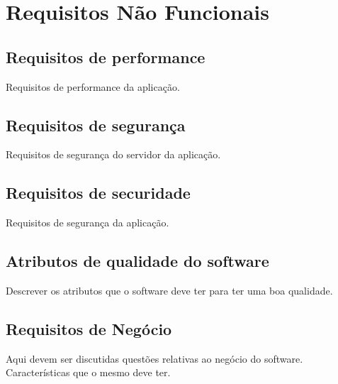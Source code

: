 \chapter{Requisitos Não Funcionais}

\section{Requisitos de performance}

Requisitos de performance da aplicação.

\section{Requisitos de segurança}

Requisitos de segurança do servidor da aplicação.

\section{Requisitos de securidade}

Requisitos de segurança da aplicação.

\section{Atributos de qualidade do software}

Descrever os atributos que o software deve ter para ter uma boa qualidade.

\section{Requisitos de Negócio}

Aqui devem ser discutidas questões relativas ao negócio do software. Características que o mesmo deve ter.
